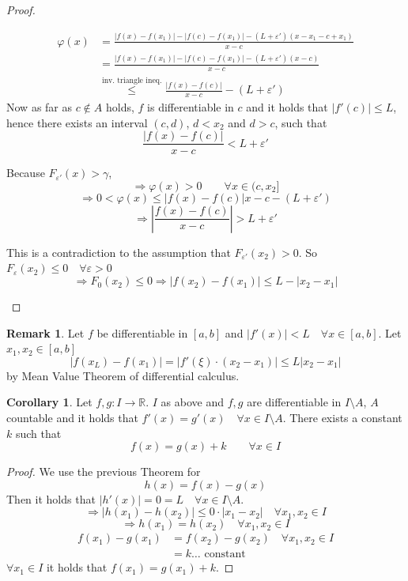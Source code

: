 \documentclass[a4paper,landscape,twocolumn]{article}
\theoremstyle{definition}
\newtheorem{rem}{Remark}
\newtheorem{cor}{Corollary}
\newcommand\abs[1]{\left|#1\right|}
\begin{document}
\begin{proof}
\begin{itemize}
      \begin{align*}
        \varphi(x) &= \frac{\abs{f(x) - f(x_1)} - \abs{f(c) - f(x_1)} - (L + \varepsilon')(x - x_1 - c + x_1)}{x - c} \\
          &= \frac{\abs{f(x) - f(x_1)} - \abs{f(c) - f(x_1)} - (L + \varepsilon')(x - c)}{x - c} \\
          &\overset{\text{inv. triangle ineq.}}{\leq} \frac{\abs{f(x) - f(c)}}{x - c} - (L + \varepsilon')
      \end{align*}
      Now as far as $c \not\in A$ holds, $f$ is differentiable in $c$ and it holds that $\abs{f'(c)} \leq L$,
      hence there exists an interval $(c, d)$, $d < x_2$ and $d > c$, such that
      \[ \frac{\abs{f(x) - f(c)}}{x - c} < L + \varepsilon' \]

      Because $F_{\varepsilon'}(x) > \gamma$,
      \[ \Rightarrow \varphi(x) > 0 \qquad \forall x \in (c, x_2] \]
      \[ \Rightarrow 0 < \varphi(x) \leq \abs{f(x) - f(c)}{x - c} - (L + \varepsilon') \]
      \[ \Rightarrow \abs{\frac{f(x) - f(c)}{x - c}} > L + \varepsilon' \]

      This is a contradiction to the assumption that $F_{\varepsilon'}(x_2) > 0$.
      So $F_{\varepsilon}(x_2) \leq 0 \quad \forall \varepsilon > 0$
      \[ \Rightarrow F_0(x_2) \leq 0 \Rightarrow \abs{f(x_2) - f(x_1)} \leq L - \abs{x_2 - x_1} \]
  \end{itemize}
\end{proof}

\begin{rem}
  Let $f$ be differentiable in $[a,b]$ and $\abs{f'(x)} < L \quad \forall x \in [a,b]$.
  Let $x_1, x_2 \in [a,b]$
  \[ \abs{f(x_L) - f(x_1)} = \abs{f'(\xi) \cdot (x_2 - x_1)} \leq L \abs{x_2 - x_1} \]
  by Mean Value Theorem of differential calculus.
\end{rem}

\begin{cor}
  Let $f,g: I \to \mathbb R$. $I$ as above and $f,g$ are differentiable in $I \setminus A$,
  $A$ countable and it holds that $f'(x) = g'(x) \quad \forall x \in I \setminus A$.
  There exists a constant $k$ such that
  \[ f(x) = g(x) + k \qquad \forall x \in I \]
\end{cor}
\begin{proof}
  We use the previous Theorem for
  \[ h(x) = f(x) - g(x) \]
  Then it holds that $\abs{h'(x)} = 0 = L \quad \forall x \in I \setminus A$.
  \[ \Rightarrow \abs{h(x_1) - h(x_2)} \leq 0 \cdot \abs{x_1 - x_2} \quad \forall x_1, x_2 \in I \]
  \[ \Rightarrow h(x_1) = h(x_2) \quad \forall x_1, x_2 \in I \]
  \begin{align*}
    f(x_1) - g(x_1)
      &= f(x_2) - g(x_2) \quad \forall x_1, x_2 \in I \\
      &= k \ldots \text{ constant}
  \end{align*}
  $\forall x_1 \in I$ it holds that $f(x_1) = g(x_1) + k$.
\end{proof}
\end{document}
